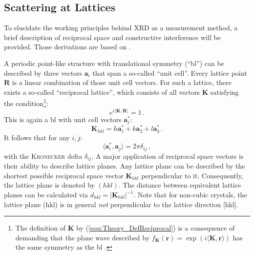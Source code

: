 \subsection{Scattering at Lattices}
To elucidate the working principles behind \gls{XRD} as a measurement method, a brief description of reciprocal space and constructive interference will be provided.
Those derivations are based on \textcite{ashcroft1976}.

A periodic point-like structure with translational symmetry (\enquote{\gls{bl}}) can be described by three vectors $\mathbf{a}_i$ that span a so-called \enquote{unit cell}.
Every lattice point $\mathbf{R}$ is a linear combination of those unit cell vectors.
For such a lattice, there exists a so-called \enquote{reciprocal lattice}, which consists of all vectors $\mathbf{K}$ satisfying the condition\footnote{
    The definition of $\textbf{K}$ by (\ref{equ:Theory_DefReciprocal}) is a consequence of demanding that the plane wave described by $f_\mathbf{K}(\mathbf{r})=\exp(i\langle\mathbf{K},\mathbf{r}\rangle)$ has the same symmetry as the \gls{bl}
        \cite{ashcroft1976}.
}:
\begin{equation}\label{equ:Theory_DefReciprocal}
    e^{i\langle\mathbf{K},\mathbf{R}\rangle}=1\,.
\end{equation}
This is again a \gls{bl} with unit cell vectors $\mathbf{a}_j^*$:
\begin{equation}
    \mathbf{K}_{hkl}=h\mathbf{a}_1^*+k\mathbf{a}_2^*+l\mathbf{a}_3^*\,.
\end{equation}
It follows that for any $i,j$:
\begin{equation}
    \langle\mathbf{a}_i^*,\mathbf{a}_j\rangle=2\pi\delta_{ij}\,,
\end{equation}
with the \textsc{Kronecker} delta $\delta_{ij}$.
A major application of reciprocal space vectors is their ability to describe lattice planes.
Any lattice plane can be described by the shortest possible reciprocal space vector $\mathbf{K}_{hkl}$ perpendicular to it.
Consequently, the lattice plane is denoted by $(hkl)$.
The distance between equivalent lattice planes can be calculated via $d_{hkl}=|\mathbf{K}_{hkl}|^{-1}$.
Note that for non-cubic crystals, the lattice plane (hkl) is in general \textit{not} perpendicular to the lattice direction [hkl].

